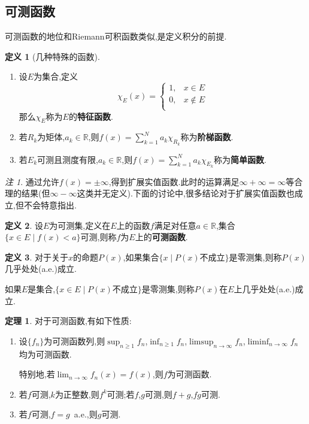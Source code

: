 \documentclass{ctexart}
\theoremstyle{definition}
\newtheorem{definition}{定义}
\newtheorem{theorem}{定理}
\theoremstyle{remark}
\newtheorem*{remark}{注}
\begin{document}
	\subsection{可测函数}
	可测函数的地位和Riemann可积函数类似,是定义积分的前提.
	
	\begin{definition}[几种特殊的函数]
		\hspace*{\fill}
		
		\begin{enumerate}
			\item 设$E$为集合,定义
			\begin{equation*}
				\chi_E(x)=
				\begin{cases}
					1, & x\in E \\
					0, & x\notin E \\
				\end{cases}
			\end{equation*}
			那么$\chi_E$称为$E$的\textbf{特征函数}.
			\item 若$R_k$为矩体,$a_k\in\mathbb{R}$,则$f(x)=\sum_{k=1}^N{a_k\chi_{R_k}}$称为\textbf{阶梯函数}.
			\item 若$E_k$可测且测度有限,$a_k\in\mathbb{R}$,则$f(x)=\sum_{k=1}^N{a_k\chi_{E_k}}$称为\textbf{简单函数}.
		\end{enumerate}
	\end{definition}
	
	\begin{remark}
		通过允许$f(x)=\pm\infty$,得到扩展实值函数.此时的运算满足$\infty+\infty=\infty$等合理的结果(但$\infty-\infty$这类并无定义).下面的讨论中,很多结论对于扩展实值函数也成立,但不会特意指出.
	\end{remark}
	
	\begin{definition}
		设$E$为可测集,定义在$E$上的函数$f$满足对任意$a\in\mathbb{R}$,集合$\{x\in E\mid f(x)<a\}$可测,则称$f$为$E$上的\textbf{可测函数}.
	\end{definition}
	\begin{definition}
		对于关于$x$的命题$P(x)$,如果集合$\{x\mid P(x)\mbox{不成立}\}$是零测集,则称$P(x)$几乎处处(a.e.)成立.
		
		如果$E$是集合,$\{x\in E\mid P(x)\mbox{不成立}\}$是零测集,则称$P(x)$在$E$上几乎处处(a.e.)成立.
	\end{definition}
	\begin{theorem}
		对于可测函数,有如下性质:
		\begin{enumerate}
			\item 设$\{f_n\}$为可测函数列,则$\sup_{n\ge 1}{f_n}$,$\inf_{n\ge 1}{f_n}$,$\limsup_{n\to\infty}{f_n}$,$\liminf_{n\to\infty}{f_n}$均为可测函数.
			
			特别地,若$\lim_{n\to\infty}{f_n(x)}=f(x)$,则$f$为可测函数.
			\item 若$f$可测,$k$为正整数,则$f^k$可测;若$f$,$g$可测,则$f+g$,$fg$可测.
			\item 若$f$可测,$f=g$\ a.e.,则$g$可测.
		\end{enumerate}
	\end{theorem}
	
\end{document}
